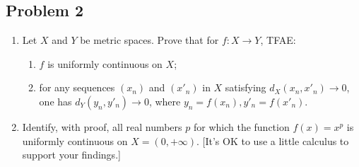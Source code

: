 \documentclass{article}
\begin{document}
\subsection*{Problem 2}
{\it
\begin{enumerate}
	\item Let $X$ and $Y$ be metric spaces. Prove that for $f \colon X \to Y$, TFAE:
	\begin{enumerate}
		\item $f$ is uniformly continuous on $X$;
		\item for any sequences $(x_n)$ and $(x'_n)$ in $X$
			satisfying $d_X(x_n,x'_n) \to 0$,
			one has $d_Y(y_n,y'_n) \to 0$, where $y_n = f(x_n), y'_n=f(x'_n)$.
	\end{enumerate}
	\item Identify, with proof, all real numbers $p$ for which the function
		$f(x) = x^p$ is uniformly continuous on $X = (0,+\infty)$.
		[It's OK to use a little calculus to support your findings.]
\end{enumerate}}
\end{document}
